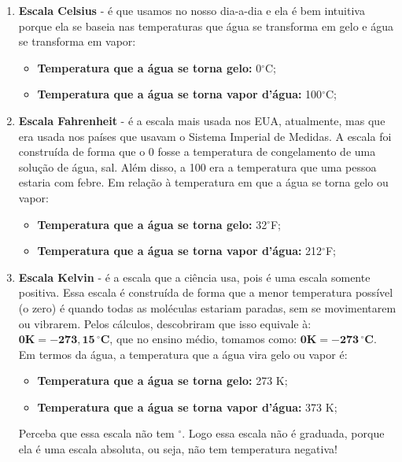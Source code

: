 \documentclass[12pt]{extarticle}
\newcommand{\<}{\langle}
\renewcommand{\>}{\rangle}
\newcommand{\grad}{$^\circ$}
\theoremstyle{definition}
\begin{document}
    \begin{enumerate}
        \item \textbf{Escala Celsius} - é que usamos no nosso dia-a-dia e ela é bem intuitiva porque ela se baseia nas temperaturas que água se transforma em gelo e água se transforma em vapor:
        \begin{itemize}
            \item \textbf{Temperatura que a água se torna gelo:} 0\grad C;
            \item \textbf{Temperatura que a água se torna vapor d'água:} 100\grad C;
        \end{itemize}
        
        \item \textbf{Escala Fahrenheit} - é a escala mais usada nos EUA, atualmente, mas que era usada nos países que usavam o Sistema Imperial de Medidas. A escala foi construída de forma que o 0 fosse a temperatura de congelamento de uma solução de água, sal. Além disso, a 100 era a temperatura que uma pessoa estaria com febre. Em relação à temperatura em que a água se torna gelo ou vapor:
        \begin{itemize}
            \item \textbf{Temperatura que a água se torna gelo:} 32\grad F;
            \item \textbf{Temperatura que a água se torna vapor d'água:} 212\grad F;
        \end{itemize}
        
        \item \textbf{Escala Kelvin} - é a escala que a ciência usa, pois é uma escala somente positiva. Essa escala é construída de forma que a menor temperatura possível (o zero) é quando todas as moléculas estariam paradas, sem se movimentarem ou vibrarem. Pelos cálculos, descobriram que isso equivale à: $\mathbf{0K = -273,15\, ^\circ C}$, que no ensino médio, tomamos como: $\mathbf{0K = -273\,^\circ C}$. Em termos da água, a temperatura que a água vira gelo ou vapor é:
        \begin{itemize}
            \item \textbf{Temperatura que a água se torna gelo:} 273 K;
            \item \textbf{Temperatura que a água se torna vapor d'água:} 373 K;
        \end{itemize}
        
        Perceba que essa escala não tem \grad. Logo essa escala não é graduada, porque ela é uma escala absoluta, ou seja, não tem temperatura negativa!
    \end{enumerate}
    
\end{document}
